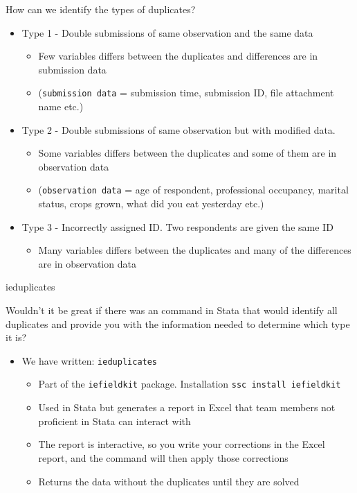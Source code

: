 \documentclass[aspectratio=169]{beamer}
\begin{document}
\begin{frame}{How can we identify the types of duplicates?}
	\begin{itemize}
		\item Type 1 - Double submissions of same observation and the same data
		\begin{itemize}
			\item Few variables differs between the duplicates and differences are in submission data
			\item (\texttt{submission data} = submission time, submission ID, file attachment name etc.)
		\end{itemize}
		\item Type 2 - Double submissions of same observation but with modified data.
		\begin{itemize}
			\item Some variables differs between the duplicates and some of them are in observation data
			\item (\texttt{observation data} = age of respondent, professional occupancy, marital status, crops grown, what did you eat yesterday etc.)
		\end{itemize}
		\item Type 3 - Incorrectly assigned ID. Two respondents are given the same ID
		\begin{itemize}
			\item Many variables differs between the duplicates and many of the differences are in observation data
		\end{itemize}
	\end{itemize}
\end{frame}

\begin{frame}{ieduplicates}
	
	Wouldn't it be great if there was an command in Stata that would identify all duplicates and provide you with the information needed to determine which type it is?

	\begin{itemize}
		\item We have written: \texttt{ieduplicates}
		\begin{itemize}
			\item Part of the \texttt{iefieldkit} package. Installation \texttt{ssc install iefieldkit}
			\item Used in Stata but generates a report in Excel that team members not proficient in Stata can interact with
			\item The report is interactive, so you write your corrections in the Excel report, and the command will then apply those corrections
			\item Returns the data without the duplicates until they are solved
		\end{itemize}
	\end{itemize}
\end{frame}
\end{document}
